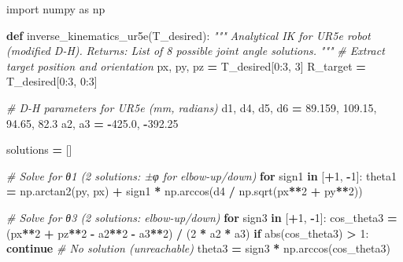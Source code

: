 \documentclass[
]{article}
\newenvironment{Shaded}{\begin{snugshade}}{\end{snugshade}}
\newcommand{\BuiltInTok}[1]{#1}
\newcommand{\CommentTok}[1]{\textcolor[rgb]{0.56,0.35,0.01}{\textit{#1}}}
\newcommand{\ControlFlowTok}[1]{\textcolor[rgb]{0.13,0.29,0.53}{\textbf{#1}}}
\newcommand{\DecValTok}[1]{\textcolor[rgb]{0.00,0.00,0.81}{#1}}
\newcommand{\FloatTok}[1]{\textcolor[rgb]{0.00,0.00,0.81}{#1}}
\newcommand{\ImportTok}[1]{#1}
\newcommand{\KeywordTok}[1]{\textcolor[rgb]{0.13,0.29,0.53}{\textbf{#1}}}
\newcommand{\NormalTok}[1]{#1}
\newcommand{\OperatorTok}[1]{\textcolor[rgb]{0.81,0.36,0.00}{\textbf{#1}}}
\begin{document}
\begin{Shaded}
\begin{Highlighting}[]
\ImportTok{import}\NormalTok{ numpy }\ImportTok{as}\NormalTok{ np}

\KeywordTok{def}\NormalTok{ inverse\_kinematics\_ur5e(T\_desired):}
    \CommentTok{"""}
\CommentTok{    Analytical IK for UR5e robot (modified D{-}H).}
\CommentTok{    Returns: List of 8 possible joint angle solutions.}
\CommentTok{    """}
    \CommentTok{\# Extract target position and orientation}
\NormalTok{    px, py, pz }\OperatorTok{=}\NormalTok{ T\_desired[}\DecValTok{0}\NormalTok{:}\DecValTok{3}\NormalTok{, }\DecValTok{3}\NormalTok{]}
\NormalTok{    R\_target }\OperatorTok{=}\NormalTok{ T\_desired[}\DecValTok{0}\NormalTok{:}\DecValTok{3}\NormalTok{, }\DecValTok{0}\NormalTok{:}\DecValTok{3}\NormalTok{]}

    \CommentTok{\# D{-}H parameters for UR5e (mm, radians)}
\NormalTok{    d1, d4, d5, d6 }\OperatorTok{=} \FloatTok{89.159}\NormalTok{, }\FloatTok{109.15}\NormalTok{, }\FloatTok{94.65}\NormalTok{, }\FloatTok{82.3}
\NormalTok{    a2, a3 }\OperatorTok{=} \OperatorTok{{-}}\FloatTok{425.0}\NormalTok{, }\OperatorTok{{-}}\FloatTok{392.25}

\NormalTok{    solutions }\OperatorTok{=}\NormalTok{ []}

    \CommentTok{\# Solve for θ1 (2 solutions: ±φ for elbow{-}up/down)}
    \ControlFlowTok{for}\NormalTok{ sign1 }\KeywordTok{in}\NormalTok{ [}\OperatorTok{+}\DecValTok{1}\NormalTok{, }\OperatorTok{{-}}\DecValTok{1}\NormalTok{]:}
\NormalTok{        theta1 }\OperatorTok{=}\NormalTok{ np.arctan2(py, px) }\OperatorTok{+}\NormalTok{ sign1 }\OperatorTok{*}\NormalTok{ np.arccos(d4 }\OperatorTok{/}\NormalTok{ np.sqrt(px}\OperatorTok{**}\DecValTok{2} \OperatorTok{+}\NormalTok{ py}\OperatorTok{**}\DecValTok{2}\NormalTok{))}

        \CommentTok{\# Solve for θ3 (2 solutions: elbow{-}up/down)}
        \ControlFlowTok{for}\NormalTok{ sign3 }\KeywordTok{in}\NormalTok{ [}\OperatorTok{+}\DecValTok{1}\NormalTok{, }\OperatorTok{{-}}\DecValTok{1}\NormalTok{]:}
\NormalTok{            cos\_theta3 }\OperatorTok{=}\NormalTok{ (px}\OperatorTok{**}\DecValTok{2} \OperatorTok{+}\NormalTok{ pz}\OperatorTok{**}\DecValTok{2} \OperatorTok{{-}}\NormalTok{ a2}\OperatorTok{**}\DecValTok{2} \OperatorTok{{-}}\NormalTok{ a3}\OperatorTok{**}\DecValTok{2}\NormalTok{) }\OperatorTok{/}\NormalTok{ (}\DecValTok{2} \OperatorTok{*}\NormalTok{ a2 }\OperatorTok{*}\NormalTok{ a3)}
            \ControlFlowTok{if} \BuiltInTok{abs}\NormalTok{(cos\_theta3) }\OperatorTok{\textgreater{}} \DecValTok{1}\NormalTok{:}
                \ControlFlowTok{continue}  \CommentTok{\# No solution (unreachable)}
\NormalTok{            theta3 }\OperatorTok{=}\NormalTok{ sign3 }\OperatorTok{*}\NormalTok{ np.arccos(cos\_theta3)}


\end{Highlighting}
\end{Shaded}
\end{document}
